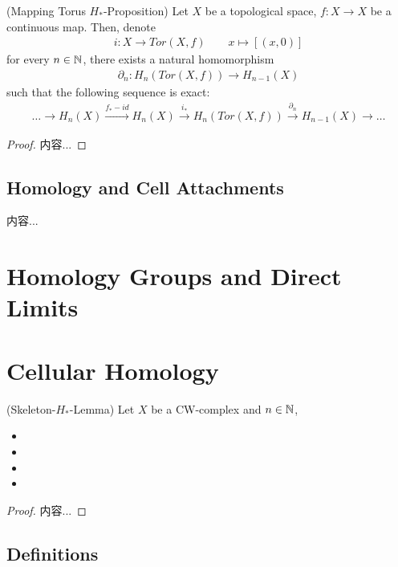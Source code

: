 \documentclass[Total.tex]{subfiles}
\begin{document}
			\begin{proposition}
				(Mapping Torus $H_*$-Proposition) Let $X$ be a topological space, $f:X\rightarrow X$ be a continuous map. Then, denote
				\begin{gather*}
					i:X\rightarrow Tor(X,f)\qquad x\mapsto [(x,0)]
				\end{gather*}
				for every $n\in \mathbb{N}$, there exists a natural homomorphism 
				\begin{gather*}
					\partial_n:H_n(Tor(X,f))\rightarrow H_{n-1}(X)
				\end{gather*}
				such that the following sequence is exact:
				\begin{gather*}
					\dots\rightarrow H_n(X)\stackrel{f_*-id}{\rightarrow} H_n(X)\stackrel{i_*}{\rightarrow} H_n(Tor(X,f))\stackrel{\partial_n}{\rightarrow} H_{n-1}(X)\rightarrow \dots
				\end{gather*}
			\end{proposition}
			\begin{proof}
				内容...
			\end{proof}
			
			\subsection{Homology and Cell Attachments}
			\begin{proposition}
				内容...
			\end{proposition}
		\section{Homology Groups and Direct Limits}
		\section{Cellular Homology}
			\begin{lemma}
				(Skeleton-$H_*$-Lemma) Let $X$ be a CW-complex and $n\in \mathbb{N}$,
				\begin{itemize}
					\item 
					\item 
					\item 
					\item 
				\end{itemize}
			\end{lemma}
			\begin{proof}
				内容...
			\end{proof}
			\subsection{Definitions}
\end{document}
